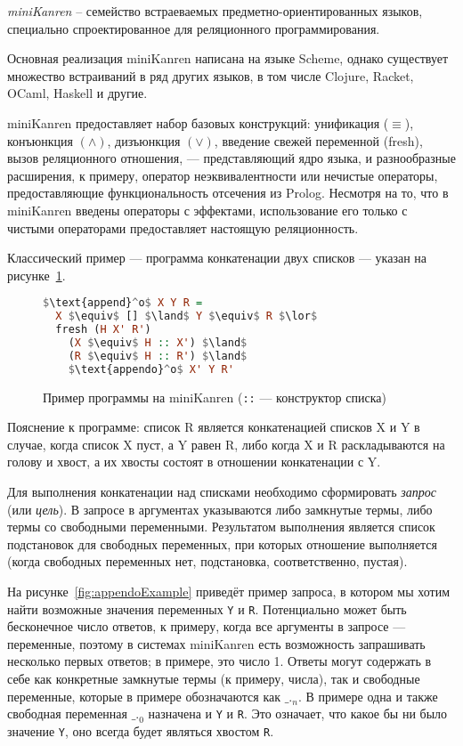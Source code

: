 {\it miniKanren} -- семейство встраеваемых предметно-ориентированных языков, специально спроектированное для
реляционного программирования\cite{byrdMK}.

Основная реализация miniKanren написана на языке Scheme\cite{reasonedSchemer}, однако существует множество встраиваний
в ряд других языков, в том числе Clojure, Racket, OCaml, Haskell и другие.

miniKanren предоставляет набор базовых конструкций: унификация ($\equiv$),
конъюнкция $(\land)$, дизъюнкция $(\lor)$, введение свежей переменной (fresh), вызов реляционного отношения,
--- представляющий ядро языка, и разнообразные расширения, к примеру, оператор неэквивалентности
 или нечистые операторы, предоставляющие функциональность
отсечения из Prolog. Несмотря на то, что в miniKanren введены операторы с эффектами, использование
его только с чистыми операторами предоставляет настоящую реляционность.

Классический пример --- программа конкатенации двух списков --- указан на рисунке~\ref{fig:appendo}.

\begin{figure}[h!]
\begin{lstlisting}[mathescape,language=Haskell,extendedchars=\true,frame=single,basicstyle=\ttfamily]
$\text{append}^o$ X Y R =
  X $\equiv$ [] $\land$ Y $\equiv$ R $\lor$
  fresh (H X' R')
    (X $\equiv$ H :: X') $\land$
    (R $\equiv$ H :: R') $\land$
    $\text{appendo}^o$ X' Y R'
\end{lstlisting}

\caption{Пример программы на miniKanren (\lstinline{::} --- конструктор списка)}
\label{fig:appendo}
\end{figure}

Пояснение к программе:
список R является конкатенацией списков X и Y в случае, когда список X пуст, а Y равен R, либо
когда X и R раскладываются на голову и хвост, а их хвосты состоят в отношении конкатенации с Y.

Для выполнения конкатенации над списками необходимо сформировать \emph{запрос} (или \emph{цель}).
В запросе в аргументах указываются либо замкнутые термы, либо термы со свободными переменными. Результатом
выполнения является список подстановок для свободных переменных, при которых отношение выполняется
(когда свободных переменных нет, подстановка, соответственно, пустая).

На рисунке~\ref{fig:appendoExample} приведёт пример запроса, в котором мы хотим найти возможные значения
переменных \lstinline{Y} и \lstinline{R}. Потенциально может быть бесконечное число ответов, к примеру,
когда все аргументы в запросе --- переменные, поэтому в системах miniKanren есть возможность
запрашивать несколько первых ответов; в примере, это число 1. Ответы могут содержать в себе как
конкретные замкнутые термы (к примеру, числа), так и свободные переменные, которые
в примере обозначаются как $\text{\_.}_n$. В примере одна и также свободная переменная $\text{\_.}_0$
назначена и \lstinline{Y} и \lstinline{R}. Это означает, что какое бы ни было значение \lstinline{Y}, оно всегда
будет являться хвостом \lstinline{R}.

